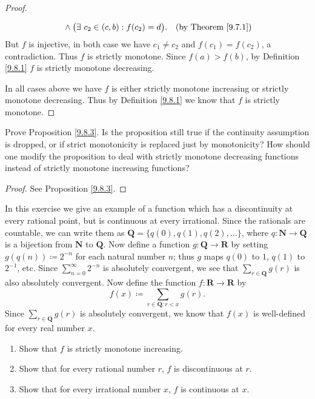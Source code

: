 \begin{proof}
\begin{enumerate}
\begin{align*}
                           & \land \big(\exists\ c_2 \in (c, b) : f(c_2) = d\big).         & \text{(by Theorem \ref{9.7.1})} \\
              \end{align*}
              But \(f\) is injective, in both case we have \(c_1 \neq c_2\) and \(f(c_1) = f(c_2)\), a contradiction.
              Thus \(f\) is strictly monotone.
              Since \(f(a) > f(b)\), by Definition \ref{9.8.1} \(f\) is strictly monotone decreasing.
    \end{enumerate}
    In all cases above we have \(f\) is either strictly monotone increasing or strictly monotone decreasing.
    Thus by Definition \ref{9.8.1} we know that \(f\) is strictly monotone.
\end{proof}

\begin{exercise}\label{ex 9.8.4}
    Prove Proposition \ref{9.8.3}.
    Is the proposition still true if the continuity assumption is dropped, or if strict monotonicity is replaced just by monotonicity?
    How should one modify the proposition to deal with strictly monotone decreasing functions instead of strictly monotone increasing functions?
\end{exercise}

\begin{proof}
    See Proposition \ref{9.8.3}.
\end{proof}

\begin{exercise}\label{ex 9.8.5}
    In this exercise we give an example of a function which has a discontinuity at every rational point, but is continuous at every irrational.
    Since the rationals are countable, we can write them as \(\mathbf{Q} = \{q(0), q(1), q(2), \dots\}\), where \(q : \mathbf{N} \to \mathbf{Q}\) is a bijection from \(\mathbf{N}\) to \(\mathbf{Q}\).
    Now define a function \(g : \mathbf{Q} \to \mathbf{R}\) by setting \(g(q(n)) \coloneqq 2^{-n}\) for each natural number \(n\);
    thus \(g\) maps \(q(0)\) to \(1\), \(q(1)\) to \(2^{-1}\), etc.
    Since \(\sum_{n = 0}^\infty 2^{-n}\) is absolutely convergent, we see that \(\sum_{r \in \mathbf{Q}} g(r)\) is also absolutely convergent.
    Now define the function \(f : \mathbf{R} \to \mathbf{R}\) by
    \[
        f(x) \coloneqq \sum_{r \in \mathbf{Q} : r < x} g(r).
    \]
    Since \(\sum_{r \in \mathbf{Q}} g(r)\) is absolutely convergent, we know that \(f(x)\) is well-defined for every real number \(x\).
    \begin{enumerate}
        \item Show that \(f\) is strictly monotone increasing.
        \item Show that for every rational number \(r\), \(f\) is discontinuous at \(r\).
        \item Show that for every irrational number \(x\), \(f\) is continuous at \(x\).
    \end{enumerate}
\end{exercise}

